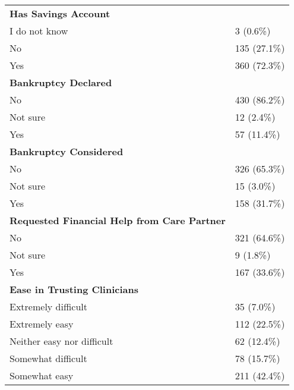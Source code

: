 \begin{longtable}{ll}
\textbf{Has Savings Account} & \\
\hspace{1em}I do not know & 3 (0.6\%) \\
\hspace{1em}No & 135 (27.1\%) \\
\hspace{1em}Yes & 360 (72.3\%) \\

\textbf{Bankruptcy Declared} & \\
\hspace{1em}No & 430 (86.2\%) \\
\hspace{1em}Not sure & 12 (2.4\%) \\
\hspace{1em}Yes & 57 (11.4\%) \\

\textbf{Bankruptcy Considered} & \\
\hspace{1em}No & 326 (65.3\%) \\
\hspace{1em}Not sure & 15 (3.0\%) \\
\hspace{1em}Yes & 158 (31.7\%) \\

\textbf{Requested Financial Help from Care Partner} & \\
\hspace{1em}No & 321 (64.6\%) \\
\hspace{1em}Not sure & 9 (1.8\%) \\
\hspace{1em}Yes & 167 (33.6\%) \\

\textbf{Ease in Trusting Clinicians} & \\
\hspace{1em}Extremely difficult & 35 (7.0\%) \\
\hspace{1em}Extremely easy & 112 (22.5\%) \\
\hspace{1em}Neither easy nor difficult & 62 (12.4\%) \\
\hspace{1em}Somewhat difficult & 78 (15.7\%) \\
\hspace{1em}Somewhat easy & 211 (42.4\%) \\


\end{longtable}
